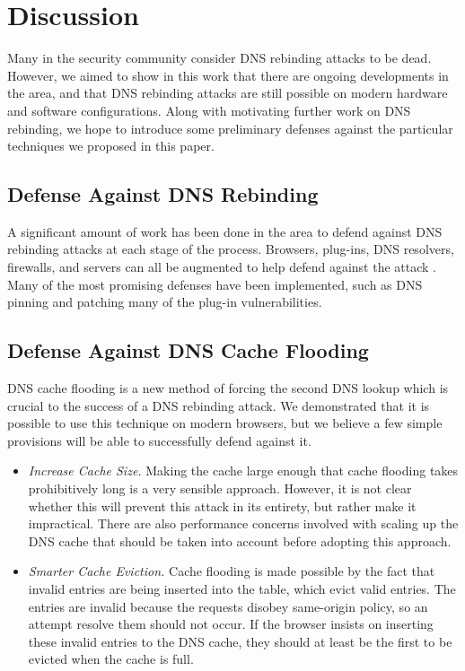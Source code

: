 \section{Discussion}
\label{sec:disc}

Many in the security community consider DNS rebinding attacks to be dead. However, we aimed to show in this work that there are ongoing developments in the area, and that DNS rebinding attacks are still possible on modern hardware and software configurations. Along with motivating further work on DNS rebinding, we hope to introduce some preliminary defenses against the particular techniques we proposed in this paper.

\subsection{Defense Against DNS Rebinding}

A significant amount of work has been done in the area to defend against DNS rebinding attacks at each stage of the process. Browsers, plug-ins, DNS resolvers, firewalls, and servers can all be augmented to help defend against the attack \cite{protectFromDNS}. Many of the most promising defenses have been implemented, such as DNS pinning and patching many of the plug-in vulnerabilities.

\subsection{Defense Against DNS Cache Flooding}

DNS cache flooding is a new method of forcing the second DNS lookup which is crucial to the success of a DNS rebinding attack. We demonstrated that it is possible to use this technique on modern browsers, but we believe a few simple provisions will be able to successfully defend against it. 

\begin{itemize}
\item \emph{Increase Cache Size.} Making the cache large enough that cache flooding takes prohibitively long is a very sensible approach. However, it is not clear whether this will prevent this attack in its entirety, but rather make it impractical. There are also performance concerns involved with scaling up the DNS cache that should be taken into account before adopting this approach. 
\item \emph{Smarter Cache Eviction.} Cache flooding is made possible by the fact that invalid entries are being inserted into the table, which evict valid entries. The entries are invalid because the requests disobey same-origin policy, so an attempt resolve them should not occur. If the browser insists on inserting these invalid entries to the DNS cache, they should at least be the first to be evicted when the cache is full.
\end{itemize}

